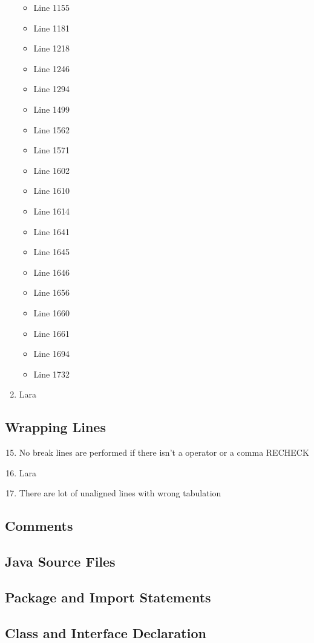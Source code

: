 \begin{enumerate}
\begin{itemize}
		\item Line 1155
		\item Line 1181
		\item Line 1218
		\item Line 1246
		\item Line 1294
		\item Line 1499
		\item Line 1562
		\item Line 1571
		\item Line 1602
		\item Line 1610
		\item Line 1614
		\item Line 1641
		\item Line 1645
		\item Line 1646
		\item Line 1656
		\item Line 1660
		\item Line 1661
		\item Line 1694
		\item Line 1732
	\end{itemize}
	\item Lara
\end{enumerate}
\subsection{Wrapping Lines}
\begin{enumerate}
	\setcounter{enumi}{14}
	\item No break lines are performed if there isn't a operator or a comma RECHECK
	\item Lara
	\item There are lot of unaligned lines with wrong tabulation
\end{enumerate}
\subsection{Comments}
\subsection{Java Source Files}
\subsection{Package and Import Statements}
\subsection{Class and Interface Declaration}
